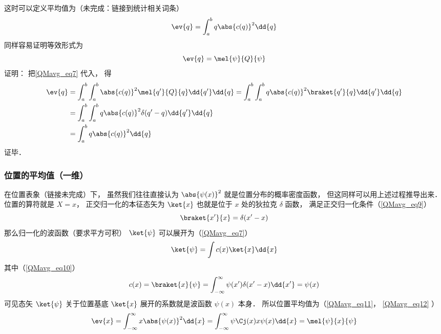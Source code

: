 这时可以定义平均值为（未完成：链接到统计相关词条）
\begin{equation}\label{QMavg_eq11}
\ev{q} = \int_a^b q \abs{c(q)}^2 \dd{q}
\end{equation}
同样容易证明等效形式为
\begin{equation}\label{QMavg_eq12}
\ev{q} = \mel{\psi}{Q}{\psi}
\end{equation}
证明： 把\autoref{QMavg_eq7} 代入， 得
\begin{equation}
\begin{aligned}
\ev{q} &= \int_a^b\int_a^b \abs{c(q)}^2\mel{q'}{Q}{q} \dd{q'}\dd{q} = \int_a^b\int_a^b q\abs{c(q)}^2\braket{q'}{q} \dd{q'}\dd{q}\\
&= \int_a^b\int_a^b q\abs{c(q)}^2\delta(q'-q) \dd{q'}\dd{q}\\
&= \int_a^b q\abs{c(q)}^2 \dd{q}
\end{aligned}
\end{equation}
证毕．

\subsubsection{位置的平均值（一维）}
在位置表象（链接未完成）下， 虽然我们往往直接认为 $\abs{\psi(x)}^2$ 就是位置分布的概率密度函数， 但这同样可以用上述过程推导出来． 位置的算符就是 $X = x$， 正交归一化的本征态矢为 $\ket{x}$ 也就是位于 $x$ 处的狄拉克 $\delta$ 函数， 满足正交归一化条件（\autoref{QMavg_eq9}）
\begin{equation}
\braket{x'}{x} = \delta(x'-x)
\end{equation}
那么归一化的波函数（要求平方可积） $\ket{\psi}$ 可以展开为（\autoref{QMavg_eq7}）
\begin{equation}
\ket{\psi} = \int c(x) \ket{x}\dd{x}
\end{equation}
其中（\autoref{QMavg_eq10}）
\begin{equation}
c(x) = \braket{x}{\psi} = \int_{-\infty}^\infty \psi(x')\delta(x'-x)\dd{x'} = \psi(x)
\end{equation}
可见态矢 $\ket{\psi}$ 关于位置基底 $\ket{x}$ 展开的系数就是波函数 $\psi(x)$ 本身． 所以位置平均值为（\autoref{QMavg_eq11}， \autoref{QMavg_eq12} ）
\begin{equation}
\ev{x} = \int_{-\infty}^\infty x \abs{\psi(x)}^2 \dd{x} = \int_{-\infty}^\infty \psi\Cj(x)x \psi(x) \dd{x} = \mel{\psi}{x}{\psi}
\end{equation}


